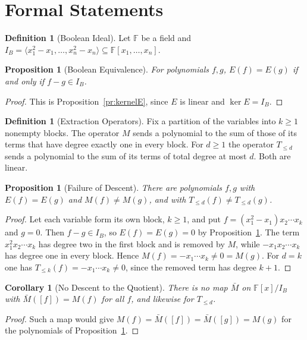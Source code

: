 \documentclass[11pt,letterpaper]{report}
\theoremstyle{plain}
\newtheorem{proposition}[theorem]{Proposition}
\newtheorem{corollary}[theorem]{Corollary}
\theoremstyle{definition}
\newtheorem{definition}[theorem]{Definition}
\theoremstyle{remark}
\begin{document}
\section{Formal Statements}

\begin{definition}[Boolean Ideal]
Let $\mathbb F$ be a field and $I_B=\langle x_1^2-x_1,\dots,x_n^2-x_n\rangle\subseteq\mathbb F[x_1,\dots,x_n]$.
\end{definition}

\begin{proposition}[Boolean Equivalence]\label{pr:booleanequiv}
For polynomials $f,g$, $E(f)=E(g)$ if and only if $f-g\in I_B$.
\end{proposition}
\begin{proof}
This is Proposition~\ref{pr:kernelE}, since $E$ is linear and $\ker E=I_B$.
\end{proof}

\begin{definition}[Extraction Operators]
Fix a partition of the variables into $k\ge1$ nonempty blocks. The operator $M$ sends a polynomial to the sum of those of its terms that have degree exactly one in every block. For $d\ge1$ the operator $T_{\le d}$ sends a polynomial to the sum of its terms of total degree at most $d$. Both are linear.
\end{definition}

\begin{proposition}[Failure of Descent]\label{pr:descent}
There are polynomials $f,g$ with $E(f)=E(g)$ and $M(f)\ne M(g)$, and with $T_{\le d}(f)\ne T_{\le d}(g)$.
\end{proposition}
\begin{proof}
Let each variable form its own block, $k\ge1$, and put $f=(x_1^2-x_1)x_2\cdots x_k$ and $g=0$. Then $f-g\in I_B$, so $E(f)=E(g)=0$ by Proposition~\ref{pr:booleanequiv}. The term $x_1^2x_2\cdots x_k$ has degree two in the first block and is removed by $M$, while $-x_1x_2\cdots x_k$ has degree one in every block. Hence $M(f)=-x_1\cdots x_k\ne0=M(g)$. For $d=k$ one has $T_{\le k}(f)=-x_1\cdots x_k\ne0$, since the removed term has degree $k+1$.
\end{proof}

\begin{corollary}[No Descent to the Quotient]
There is no map $\bar M$ on $\mathbb F[x]/I_B$ with $\bar M([f])=M(f)$ for all $f$, and likewise for $T_{\le d}$.
\end{corollary}
\begin{proof}
Such a map would give $M(f)=\bar M([f])=\bar M([g])=M(g)$ for the polynomials of Proposition~\ref{pr:descent}.
\end{proof}
\end{document}
